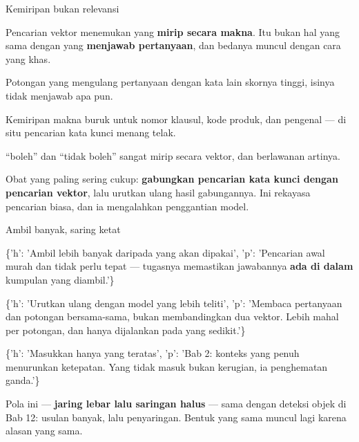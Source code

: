 \documentclass[aspectratio=169,11pt,t]{beamer}
\begin{document}
\begin{frame}[shrink=25]{Kemiripan bukan relevansi}
{\fontsize{9.4}{12.6}\selectfont\color{fg2}Pencarian vektor menemukan yang \textbf{mirip secara makna}. Itu bukan hal yang sama dengan yang \textbf{menjawab pertanyaan}, dan bedanya muncul dengan cara yang khas.\par}\vskip 4pt
\begin{minipage}[t]{0.3253\textwidth}
\begin{icardbad}
Potongan yang mengulang pertanyaan dengan kata lain skornya tinggi, isinya tidak menjawab apa pun.
\end{icardbad}
\end{minipage}%
\hfill
\begin{minipage}[t]{0.3253\textwidth}
\begin{icardbad}
Kemiripan makna buruk untuk nomor klausul, kode produk, dan pengenal --- di situ pencarian kata kunci menang telak.
\end{icardbad}
\end{minipage}%
\hfill
\begin{minipage}[t]{0.3253\textwidth}
\begin{icardbad}
``boleh'' dan ``tidak boleh'' sangat mirip secara vektor, dan berlawanan artinya.
\end{icardbad}
\end{minipage}%
\begin{iband}[signal]
Obat yang paling sering cukup: \textbf{gabungkan pencarian kata kunci dengan pencarian vektor}, lalu urutkan ulang hasil gabungannya. Ini rekayasa pencarian biasa, dan ia mengalahkan penggantian model.
\end{iband}
\end{frame}

\begin{frame}[shrink=25]{Ambil banyak, saring ketat}
\begin{isteps}
\item \{'h': 'Ambil lebih banyak daripada yang akan dipakai', 'p': 'Pencarian awal murah dan tidak perlu tepat --- tugasnya memastikan jawabannya \textbf{ada di dalam} kumpulan yang diambil.'\}
\item \{'h': 'Urutkan ulang dengan model yang lebih teliti', 'p': 'Membaca pertanyaan dan potongan bersama-sama, bukan membandingkan dua vektor. Lebih mahal per potongan, dan hanya dijalankan pada yang sedikit.'\}
\item \{'h': 'Masukkan hanya yang teratas', 'p': 'Bab 2: konteks yang penuh menurunkan ketepatan. Yang tidak masuk bukan kerugian, ia penghematan ganda.'\}
\end{isteps}
\begin{iband}[signal]
Pola ini --- \textbf{jaring lebar lalu saringan halus} --- sama dengan deteksi objek di Bab 12: usulan banyak, lalu penyaringan. Bentuk yang sama muncul lagi karena alasan yang sama.
\end{iband}
\end{frame}
\end{document}
